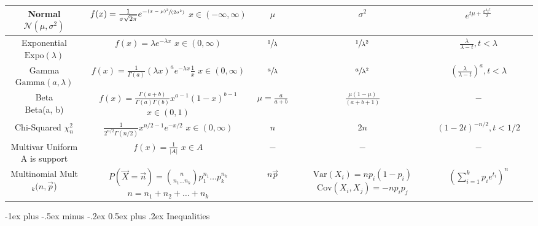 \documentclass[10pt,landscape]{article}
\makeatletter
\newcommand{\var}{\textrm{Var}}
\newcommand{\cov}{\textrm{Cov}}
\newcommand{\N}{\mathcal{N}}
\newcommand{\Beta}{\textrm{Beta}}
\newcommand{\Gam}{\textrm{Gamma}}
\newcommand{\Expo}{\textrm{Expo}}
\newcommand{\Mult}{\textrm{Mult}}
\renewcommand{\section}{\@startsection{section}{1}{0mm}%
                                {-1ex plus -.5ex minus -.2ex}%
                                {0.5ex plus .2ex}%
                                {\normalfont\large\bfseries}}
\makeatother
\begin{document}
\begin{center}
\begin{tabular}{cccccc}
\hline
\shortstack{Normal \\ $\N(\mu, \sigma^2)$} & \shortstack{$f(x) = \frac{1}{\sigma \sqrt{2\pi}} e^{-\sfrac{(x - \mu)^2}{(2 \sigma^2)}}$ \\ $x \in (-\infty, \infty)$} & $\mu$  & $\sigma^2$ & $e^{t\mu + \frac{\sigma^2t^2}{2}}$\\
\hline
\shortstack{Exponential \\ $\Expo(\lambda)$} & \shortstack{$f(x) = \lambda e^{-\lambda x}$\\$ x \in (0, \infty)$} & $\sfrac{1}{\lambda}$  & $\sfrac{1}{\lambda^2}$ & $\frac{\lambda}{\lambda - t}, t < \lambda$\\
\hline
\shortstack{Gamma \\ $\Gam(a, \lambda)$} & \shortstack{$f(x) = \frac{1}{\Gamma(a)}(\lambda x)^ae^{-\lambda x}\frac{1}{x}$\\$ x \in (0, \infty)$} & $\sfrac{a}{\lambda}$  & $\sfrac{a}{\lambda^2}$ & $\left(\frac{\lambda}{\lambda - t}\right)^a, t < \lambda$\\
\hline
\shortstack{Beta \\ \Beta(a, b)} & \shortstack{$f(x) = \frac{\Gamma(a+b)}{\Gamma(a)\Gamma(b)}x^{a-1}(1-x)^{b-1}$\\$x \in (0, 1) $} & $\mu = \frac{a}{a + b}$  & $\frac{\mu(1-\mu)}{(a + b + 1)}$ & $-$\\
\hline
\shortstack{Chi-Squared \\ $\chi_n^2$} & \shortstack{$\frac{1}{2^{n/2}\Gamma(n/2)}x^{n/2 - 1}e^{-x/2}$\\$x \in (0, \infty) $} & $n$  & $2n$ & $(1 - 2t)^{-n/2}, t < 1/2$\\
\hline
\hline
\shortstack{Multivar Uniform \\ A is support} & \shortstack{$f(x) = \frac{1}{|A|}$\\$  x \in A $} & $-$  & $-$ & $-$\\
\hline
\shortstack{Multinomial \\ \Mult$_k(n, \vec{p}$)} & \shortstack{$P(\vec{X} = \vec{n}) = {n \choose n_1\dots n_k}p_1^{n_1}\dots p_k^{n_k}$ \\ $n = n_1 + n_2 + \dots + n_k$} & $n\vec{p}$ & \shortstack{$\var(X_i) = np_i(1-p_i)$ \\ $\cov(X_i, X_j) = -np_ip_j$} & $\left(\sum_{i=1}^k p_ie^{t_i}\right)^n$ \\
\hline
\hline

\end{tabular}

\hskip 1cm
\section{Inequalities}


\end{center}
\end{document}
